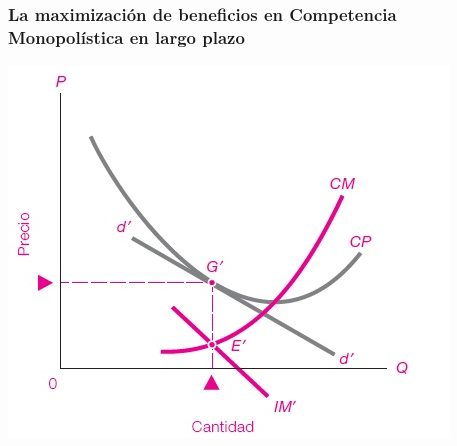 \documentclass{beamer}
\begin{document}
\begin{frame}
\frametitle{ La maximización de beneficios en Competencia Monopolística en largo plazo}
\centering
\includegraphics[scale=0.7]{Figures/Tema_08.02_compmonop.jpg}
\end{frame}
\end{document}
